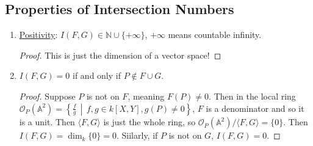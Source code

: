 \documentclass[12pt]{article}
\newcommand{\n}{\mathbb{N}}
\newcommand{\vbrack}[1]{\langle #1\rangle}
\theoremstyle{definition}
\begin{document}
\subsection{Properties of Intersection Numbers}
\begin{enumerate}
    \item \underline{Positivity}: $I(F,G)\in\n\cup\{+\infty\}$, $+\infty$ means countable infinity.
    \begin{proof}
        This is just the dimension of a vector space!
    \end{proof}
    \item $I(F,G)=0$ if and only if $P\notin F\cup G$.
    \begin{proof}
        Suppose $P$ is not on $F$, meaning $F(P)\neq0$. Then in the local ring $\mathcal{O}_P(\mathbb{A}^2)=\left\{\frac{f}{g}\,\middle|\,f,g\in k[X,Y],g(P)\neq0\right\}$, $F$ is a denominator and so it is a unit. Then $\vbrack{F,G}$ is just the whole ring, so $\mathcal{O}_P(\mathbb{A}^2)/\vbrack{F,G}=\{0\}$. Then $I(F,G)=\dim_k\{0\}=0$. Siilarly, if $P$ is not on $G$, $I(F,G)=0$.
        

\end{proof}
\end{enumerate}
\end{document}
